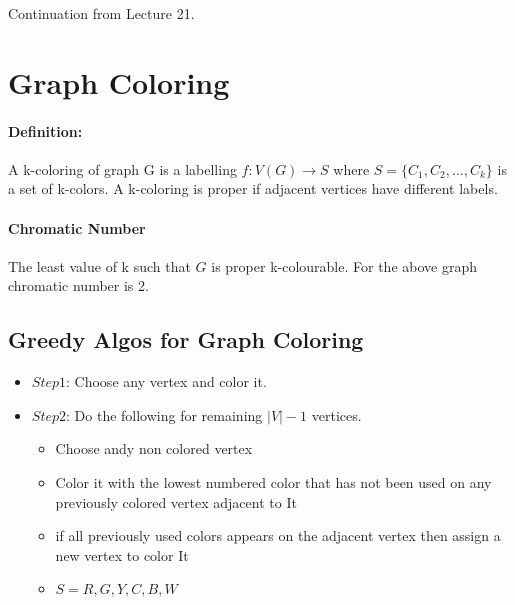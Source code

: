 


Continuation from Lecture 21. 
\section{Graph Coloring}

\paragraph{Definition:}A k-coloring of graph G is a labelling $ f: V(G) \to S $ where  $ S = \{C_1, C_2 , ... , C_k\}$ is a set of k-colors. A k-coloring is proper if adjacent vertices have different labels.

\paragraph{Chromatic Number}The least value of k such that $G$ is proper k-colourable. For the above graph chromatic number is 2.

\subsection{Greedy Algos for Graph Coloring}
\begin{itemize}
    \item $Step 1$: Choose any vertex and color it.
    \item $Step 2$: Do the following for remaining $|V| - 1$ vertices.\begin{itemize}
        \item Choose andy non colored vertex
        \item Color it with the lowest numbered color that has not been used on any previously colored vertex adjacent to It
        \item if all previously used colors appears on the adjacent vertex then assign a new vertex to color It
        \item $S = {R,G,Y,C,B,W}$
    \end{itemize}
\end{itemize}


